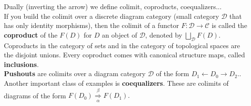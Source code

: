 Dually (inverting the arrow) we define colimit, coproducts, coequalizers...\\

If you build the colimit over a discrete diagram category (small category $\mathcal{D}$ that has only identity morphisms), then the colimit of a functor $F: \mathcal{D} \rightarrow \mathcal{C}$ is called the \textbf{coproduct} of the $F(D)$ for $D$ an object of $\mathcal{D}$, denoted by
        $
        \bigsqcup_{\mathcal{D}} F(D) .
        $
        Coproducts in the category of sets and in the category of topological spaces are the disjoint unions.
        Every coproduct comes with canonical structure maps, called \textbf{inclusions}.\\
\textbf{Pushouts} are colimits over a diagram category $\mathcal{D}$ of the form
        $
        D_1 \leftarrow D_0 \rightarrow D_2 .
        $.\\
Another important class of examples is \textbf{coequalizers}. These are colimits of diagrams of the form
        $
        F\left(D_0\right) \underset{\alpha}{\stackrel{\beta}{\Longrightarrow}} F\left(D_1\right) .
        $



